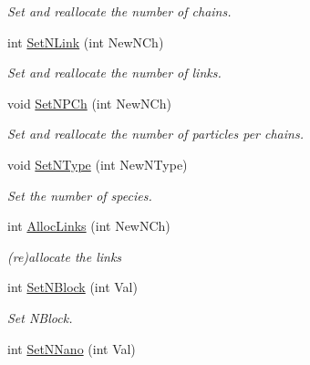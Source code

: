 \begin{DoxyCompactItemize}
\begin{DoxyCompactList}\small\item\em Set and reallocate the number of chains. \end{DoxyCompactList}\item 
int \hyperlink{classVarData_a1bc126dbe2154d5966e5d2c57af9c7c8}{Set\+N\+Link} (int New\+N\+Ch)\hypertarget{classVarData_a1bc126dbe2154d5966e5d2c57af9c7c8}{}\label{classVarData_a1bc126dbe2154d5966e5d2c57af9c7c8}

\begin{DoxyCompactList}\small\item\em Set and reallocate the number of links. \end{DoxyCompactList}\item 
void \hyperlink{classVarData_a3e021ffdb31d5f94a22435e437dc6972}{Set\+N\+P\+Ch} (int New\+N\+Ch)\hypertarget{classVarData_a3e021ffdb31d5f94a22435e437dc6972}{}\label{classVarData_a3e021ffdb31d5f94a22435e437dc6972}

\begin{DoxyCompactList}\small\item\em Set and reallocate the number of particles per chains. \end{DoxyCompactList}\item 
void \hyperlink{classVarData_ab1caa779737fb8f3bb11375fd03cb4a7}{Set\+N\+Type} (int New\+N\+Type)\hypertarget{classVarData_ab1caa779737fb8f3bb11375fd03cb4a7}{}\label{classVarData_ab1caa779737fb8f3bb11375fd03cb4a7}

\begin{DoxyCompactList}\small\item\em Set the number of species. \end{DoxyCompactList}\item 
int \hyperlink{classVarData_a6dc8858a41c1a3851b2215c6460347bf}{Alloc\+Links} (int New\+N\+Ch)\hypertarget{classVarData_a6dc8858a41c1a3851b2215c6460347bf}{}\label{classVarData_a6dc8858a41c1a3851b2215c6460347bf}

\begin{DoxyCompactList}\small\item\em (re)allocate the links \end{DoxyCompactList}\item 
int \hyperlink{classVarData_a1ba38db0d91819c6627dbac8de45b6a7}{Set\+N\+Block} (int Val)\hypertarget{classVarData_a1ba38db0d91819c6627dbac8de45b6a7}{}\label{classVarData_a1ba38db0d91819c6627dbac8de45b6a7}

\begin{DoxyCompactList}\small\item\em Set N\+Block. \end{DoxyCompactList}\item 
int \hyperlink{classVarData_ad5e77b3ade14f7be0d91ccd0f5397cb6}{Set\+N\+Nano} (int Val)\hypertarget{classVarData_ad5e77b3ade14f7be0d91ccd0f5397cb6}{}\label{classVarData_ad5e77b3ade14f7be0d91ccd0f5397cb6}


\end{DoxyCompactItemize}
